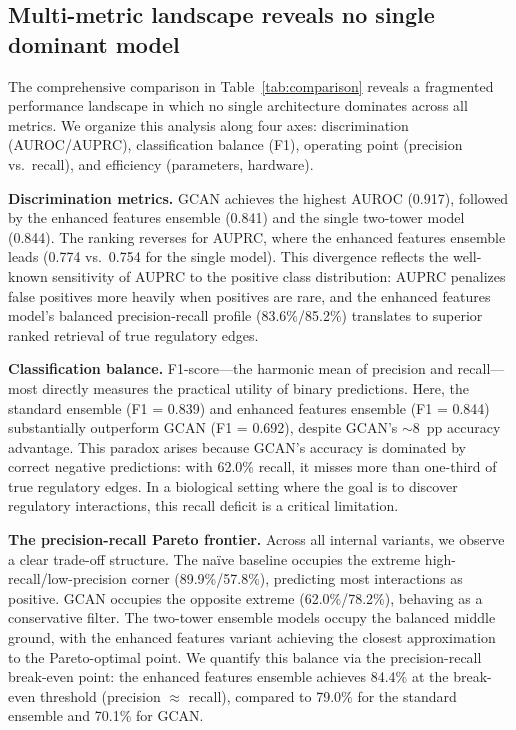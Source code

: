 \documentclass[10pt,twocolumn]{article}
\begin{document}
\subsection{Multi-metric landscape reveals no single dominant model}

The comprehensive comparison in Table~\ref{tab:comparison} reveals a fragmented performance landscape in which no single architecture dominates across all metrics.
We organize this analysis along four axes: discrimination (AUROC/AUPRC), classification balance (F1), operating point (precision vs.\ recall), and efficiency (parameters, hardware).

\textbf{Discrimination metrics.}
GCAN achieves the highest AUROC (0.917), followed by the enhanced features ensemble (0.841) and the single two-tower model (0.844).
The ranking reverses for AUPRC, where the enhanced features ensemble leads (0.774 vs.\ 0.754 for the single model).
This divergence reflects the well-known sensitivity of AUPRC to the positive class distribution: AUPRC penalizes false positives more heavily when positives are rare, and the enhanced features model's balanced precision-recall profile (83.6\%/85.2\%) translates to superior ranked retrieval of true regulatory edges.

\textbf{Classification balance.}
F1-score---the harmonic mean of precision and recall---most directly measures the practical utility of binary predictions.
Here, the standard ensemble (F1 = 0.839) and enhanced features ensemble (F1 = 0.844) substantially outperform GCAN (F1 = 0.692), despite GCAN's ${\sim}$8~pp accuracy advantage.
This paradox arises because GCAN's accuracy is dominated by correct negative predictions: with 62.0\% recall, it misses more than one-third of true regulatory edges.
In a biological setting where the goal is to discover regulatory interactions, this recall deficit is a critical limitation.

\textbf{The precision-recall Pareto frontier.}
Across all internal variants, we observe a clear trade-off structure.
The na\"{i}ve baseline occupies the extreme high-recall/low-precision corner (89.9\%/57.8\%), predicting most interactions as positive.
GCAN occupies the opposite extreme (62.0\%/78.2\%), behaving as a conservative filter.
The two-tower ensemble models occupy the balanced middle ground, with the enhanced features variant achieving the closest approximation to the Pareto-optimal point.
We quantify this balance via the precision-recall break-even point: the enhanced features ensemble achieves 84.4\% at the break-even threshold (precision $\approx$ recall), compared to 79.0\% for the standard ensemble and 70.1\% for GCAN.
\end{document}
